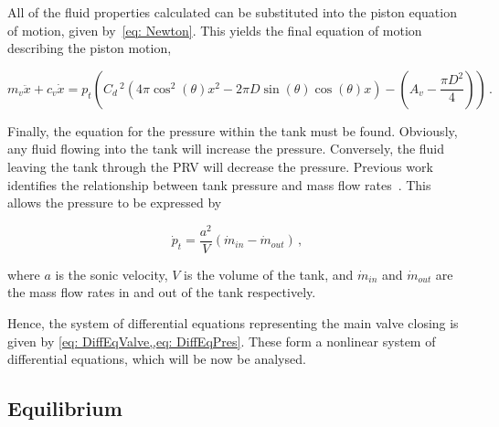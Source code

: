All of the fluid properties calculated can be substituted into the piston equation of motion, given by~\cref{eq: Newton}. This yields the final equation of motion describing the piston motion,

\begin{equation} \label{eq: DiffEqValve}
    m_v \ddot{x} + c_v \dot{x} = p_t \left(
    C_d \,^2 \left( 4 \pi \cos^2(\theta) x^2
    - 2 \pi D \sin(\theta) \cos(\theta) x \right)
    - \left( A_v - \frac{\pi D^2}{4} \right)
    \right) \, .
\end{equation}

Finally, the equation for the pressure within the tank must be found. Obviously, any fluid flowing into the tank will increase the pressure. Conversely, the fluid leaving the tank through the PRV will decrease the pressure. Previous work identifies the relationship between tank pressure and mass flow rates~\cite{Hos2015DynamicModelling}. This allows the pressure to be expressed by

\begin{equation} \label{eq: DiffEqPres}
    \dot{p}_t = \frac{a^2}{V} \left( \dot{m}_{in} - \dot{m}_{out} \right) \, ,
\end{equation}

where $a$ is the sonic velocity, $V$ is the volume of the tank, and $\dot{m}_{in}$ and $\dot{m}_{out}$ are the mass flow rates in and out of the tank respectively.

Hence, the system of differential equations representing the main valve closing is given by \cref{eq: DiffEqValve,,eq: DiffEqPres}. These form a nonlinear system of differential equations, which will be now be analysed.

\subsection{Equilibrium}





